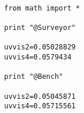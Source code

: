 \documentclass[preview=true]{standalone}
\begin{document}
\begin{verbatim}

from math import *

print "@Surveyor"

uvvis2=0.05028829
uvvis4=0.0579434

print "@Bench"

uvvis2=0.05045871
uvvis4=0.05715561

\end{verbatim}
\end{document}
